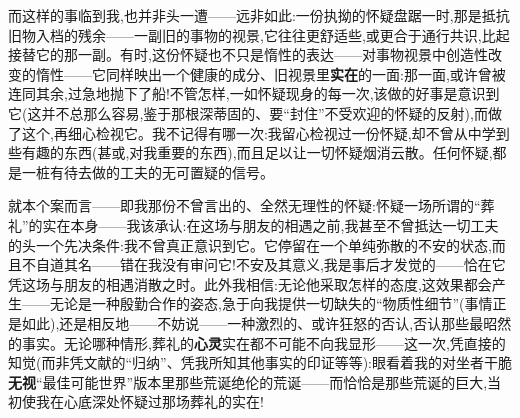 而这样的事临到我,也\dmark{}并非头一遭——远非如此:一份执拗的怀疑盘踞一时,那是抵抗旧物入档的残余——一副旧的事物的视景,它往往更舒适些,或更合于通行共识,比起接替它的那一副。有时,这份怀疑也不只是惰性的表达——对事物视景中创造性改变的惰性——它同样映出一个健康的成分、旧视景里\textbf{实在}的一面:那一面,或许曾被连同其余,过急地抛下了船!不管怎样,一如怀疑现身的每一次,该做的好事是意识到它(这并不总那么容易,鉴于那根深蒂固的、要“封住”不受欢迎的怀疑的反射),而做了这个,再细心检视它。我不记得有哪一次:我留心检视过一份怀疑,却不曾从中学到些有趣的东西(甚或,对我重要的东西),而且足以让一切怀疑烟消云散。任何怀疑,都是一桩有待去做的工夫的无可置疑的信号。

\dmark{}就本个案而言——即我那份不曾言出的、全然无理性的怀疑:怀疑一场所谓的“葬礼”的实在本身——我该承认:在这场与朋友的相遇之前,我甚至不曾抵达一切工夫的头一个先决条件:我不曾真正意识到它。它停留在一个单纯弥散的不安的状态,而且不自道其名——错在我没有审问它!不安及其意义,我是事后才发觉的——恰在它凭这场与朋友的相遇消散之时。此外我相信:无论他采取怎样的态度,这效果都会产生——无论是一种殷勤合作的姿态,急于向我提供一切缺失的“物质性细节”(事情正是如此),还是相反地——不妨说——一种激烈的、或许狂怒的否认,否认那些最昭然的事实。无论哪种情形,葬礼的\textbf{心灵}实在都不可能不向我显形——这一次,凭直接的知觉(而非凭文献的“归纳”、凭我所知其他事实的印证等等):眼看着我的对坐者干脆\textbf{无视}“最佳可能世界”版本里那些荒诞绝伦的荒诞——而恰恰是那些荒诞的巨大,当初使我在心底深处怀疑过那场葬礼的实在!

